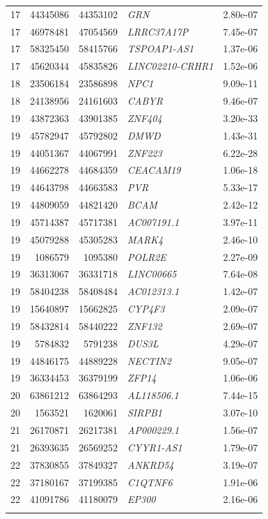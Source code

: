 \begin{longtable}{rrrlr}
   17 & 44345086 & 44353102 & \textit{GRN} & 2.80e-07 \\ 
   17 & 46978481 & 47054569 & \textit{LRRC37A17P} & 7.45e-07 \\ 
   17 & 58325450 & 58415766 & \textit{TSPOAP1-AS1} & 1.37e-06 \\ 
   17 & 45620344 & 45835826 & \textit{LINC02210-CRHR1} & 1.52e-06 \\ 
   18 & 23506184 & 23586898 & \textit{NPC1} & 9.09e-11 \\ 
   18 & 24138956 & 24161603 & \textit{CABYR} & 9.46e-07 \\ 
   19 & 43872363 & 43901385 & \textit{ZNF404} & 3.20e-33 \\ 
   19 & 45782947 & 45792802 & \textit{DMWD} & 1.43e-31 \\ 
   19 & 44051367 & 44067991 & \textit{ZNF223} & 6.22e-28 \\ 
   19 & 44662278 & 44684359 & \textit{CEACAM19} & 1.06e-18 \\ 
   19 & 44643798 & 44663583 & \textit{PVR} & 5.33e-17 \\ 
   19 & 44809059 & 44821420 & \textit{BCAM} & 2.42e-12 \\ 
   19 & 45714387 & 45717381 & \textit{AC007191.1} & 3.97e-11 \\ 
   19 & 45079288 & 45305283 & \textit{MARK4} & 2.46e-10 \\ 
   19 & 1086579 & 1095380 & \textit{POLR2E} & 2.27e-09 \\ 
   19 & 36313067 & 36331718 & \textit{LINC00665} & 7.64e-08 \\ 
   19 & 58404238 & 58408484 & \textit{AC012313.1} & 1.42e-07 \\ 
   19 & 15640897 & 15662825 & \textit{CYP4F3} & 2.09e-07 \\ 
   19 & 58432814 & 58440222 & \textit{ZNF132} & 2.69e-07 \\ 
   19 & 5784832 & 5791238 & \textit{DUS3L} & 4.29e-07 \\ 
   19 & 44846175 & 44889228 & \textit{NECTIN2} & 9.05e-07 \\ 
   19 & 36334453 & 36379199 & \textit{ZFP14} & 1.06e-06 \\ 
   20 & 63861212 & 63864293 & \textit{AL118506.1} & 7.44e-15 \\ 
   20 & 1563521 & 1620061 & \textit{SIRPB1} & 3.07e-10 \\ 
   21 & 26170871 & 26217381 & \textit{AP000229.1} & 1.56e-07 \\ 
   21 & 26393635 & 26569252 & \textit{CYYR1-AS1} & 1.79e-07 \\ 
   22 & 37830855 & 37849327 & \textit{ANKRD54} & 3.19e-07 \\ 
   22 & 37180167 & 37199385 & \textit{C1QTNF6} & 1.91e-06 \\ 
   22 & 41091786 & 41180079 & \textit{EP300} & 2.16e-06 \\ 
   \bottomrule
\label{tab:cis-TWAS_riskgenes}
\end{longtable}
\pagebreak

